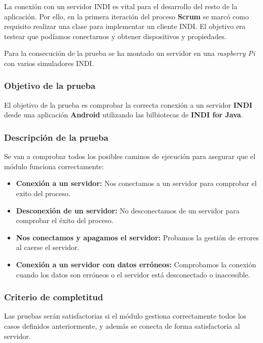 La conexión con un servidor INDI es vital para el desarrollo del resto de la aplicación. Por ello, en la primera iteración del proceso \textbf{Scrum} se marcó como requisito realizar una clase para implementar un cliente INDI. El objetivo era testear que podíamos conectarnos y obtener dispositivos y propiedades.

\bigskip
Para la consecución de la prueba se ha montado un servidor en una \textit{raspberry Pi} con varios simuladores INDI.

\subsubsection{Objetivo de la prueba}

El objetivo de la prueba es comprobar la correcta conexión a un servidor \textbf{INDI} desde una aplicación \textbf{Android} utilizando las bilbiotecas de \textbf{INDI for Java}.

\subsubsection{Descripción de la prueba}

Se van a comprobar todos los posibles caminos de ejecución para asegurar que el módulo funciona correctamente:

\begin{itemize}
  \item \textbf{Conexión a un servidor:} Nos conectamos a un servidor para comprobar el exito del proceso.
  \item \textbf{Desconexión de un servidor:} No desconectamos de un servidor para comprobar el éxito del proceso.
  \item \textbf{Nos conectamos y apagamos el servidor:} Probamos la gestión de errores al caerse el servidor.
  \item \textbf{Conexión a un servidor con datos erróneos:} Comprobamos la conexión cuando los datos son erróneos o el servidor está desconectado o inaccesible.
\end{itemize}

\subsubsection{Criterio de completitud}

Las pruebas serán satisfactorias si el módulo gestiona correctamente todos los casos definidos anteriormente, y además se conecta de forma satisfactoria al servidor.

